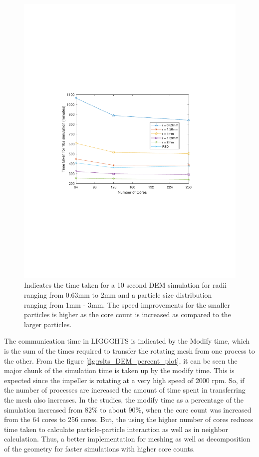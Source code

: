 \documentclass[preprint,11pt,authoryear]{elsarticle}
\begin{document}
\begin{figure}[H]
\centering
\includegraphics[scale=0.85]{rslsts_DEM_alldia_timing_mtlb.pdf}
\caption{ Indicates the time taken for a 10 second DEM simulation for radii ranging from
 0.63mm to 2mm and a particle size distribution ranging from 1mm - 3mm. The speed improvements 
 for the smaller particles is higher as the core count is increased as compared to the larger particles.}
\label{fig:rslts_DEM_timing_studies}
\end{figure}
 The communication time in LIGGGHTS is indicated by the Modify time, which is the sum of the 
times required to transfer the rotating mesh from one process to the other. From the figure 
\ref{fig:rslts_DEM_percent_plot}, it can be seen the major chunk of the simulation time is taken up by 
the modify time. This is expected since the impeller is rotating at a very high speed of 2000 rpm. So, if 
the number of processes are increased the amount of time spent in transferring the mesh also 
increases. In the studies, the modify time as a percentage of the simulation increased from 82\% to 
about 90\%, when the core count was increased from the 64 cores to 256 cores. But, the using the 
higher number of cores reduces time taken to calculate particle-particle interaction as well as in 
neighbor calculation. Thus, a better implementation for meshing as well as decomposition of the 
geometry for faster simulations with higher core counts.
\end{document}

